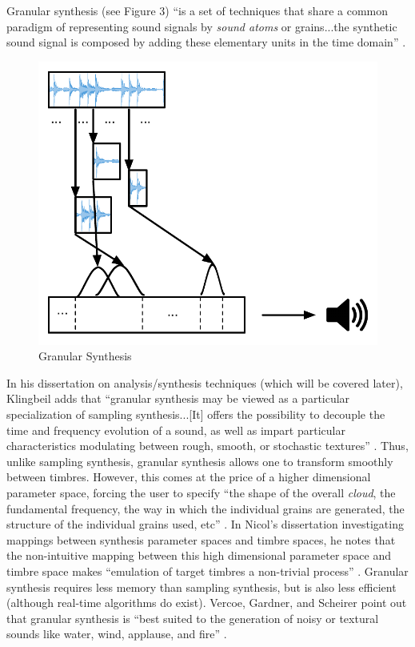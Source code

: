 \documentclass[12pt]{report} 	%
\numberwithin{figure}{chapter}
\numberwithin{table}{chapter}
\numberwithin{equation}{chapter}
\begin{document}
\begin{flushleft}
Granular synthesis (see Figure 3) ``is a set of techniques that share a common paradigm of representing sound signals by \textit{sound atoms} or grains...the synthetic sound signal is composed by adding these elementary units in the time domain'' \cite[p.13]{Tolonen:1998bh}. 
\begin{figure}[h!]
\begin{center}
\includegraphics[scale=0.8]{GranularSynthesis}
\caption[Granular synthesis]{Granular Synthesis}
\end{center}
\end{figure}
In his dissertation on analysis/synthesis techniques (which will be covered later), Klingbeil adds that ``granular synthesis may be viewed as a particular specialization of sampling synthesis...[It] offers the possibility to decouple the time and frequency evolution of a sound, as well as impart particular characteristics modulating between rough, smooth, or stochastic textures'' \cite[p. 6]{Klingbeil:2009lo}. Thus, unlike sampling synthesis, granular synthesis allows one to transform smoothly between timbres. However, this comes at the price of a higher dimensional parameter space, forcing the user to specify ``the shape of the overall \textit{cloud}, the fundamental frequency, the way in which the individual grains are generated, the structure of the individual grains used, etc'' \cite[p. 5]{Johnson:1998sh}. In Nicol's dissertation investigating mappings between synthesis parameter spaces and timbre spaces, he notes that the non-intuitive mapping between this high dimensional parameter space and timbre space makes ``emulation of target timbres a non-trivial process'' \cite[p. 49]{Nicol:2005rp}. Granular synthesis requires less memory than sampling synthesis, but is also less efficient (although real-time algorithms do exist). Vercoe, Gardner, and Scheirer point out that granular synthesis is ``best suited to the generation of noisy or textural sounds like water, wind, applause, and fire'' \cite[p. 6]{Vercoe:1998hh}.


\end{flushleft}
\end{document}
